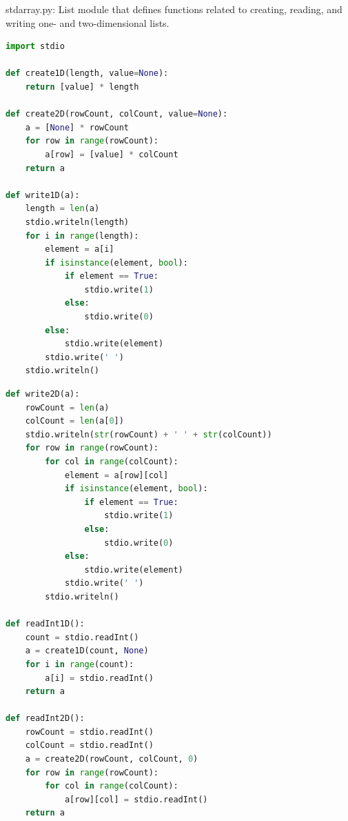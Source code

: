 \documentclass[8pt,a4paper,compress]{beamer}
\begin{document}
\begin{frame}[fragile]
\pause

\begin{framed}
\tiny stdarray.py: List module that defines functions related to creating, reading, and writing one- and two-dimensional lists.
\end{framed}

\begin{lstlisting}[language=Python]
import stdio

def create1D(length, value=None):
    return [value] * length

def create2D(rowCount, colCount, value=None):
    a = [None] * rowCount
    for row in range(rowCount):
        a[row] = [value] * colCount
    return a

def write1D(a):
    length = len(a)
    stdio.writeln(length)
    for i in range(length):
        element = a[i]
        if isinstance(element, bool):
            if element == True:
                stdio.write(1)
            else:
                stdio.write(0) 
        else:
            stdio.write(element)
        stdio.write(' ')
    stdio.writeln()
\end{lstlisting}
\end{frame}

\begin{frame}[fragile]
\pause

\begin{lstlisting}[language=Python]
def write2D(a):
    rowCount = len(a)
    colCount = len(a[0])
    stdio.writeln(str(rowCount) + ' ' + str(colCount))
    for row in range(rowCount):
        for col in range(colCount):
            element = a[row][col]
            if isinstance(element, bool):
                if element == True:
                    stdio.write(1)
                else:
                    stdio.write(0)
            else:
                stdio.write(element)
            stdio.write(' ')
        stdio.writeln()

def readInt1D():
    count = stdio.readInt()
    a = create1D(count, None)
    for i in range(count):
        a[i] = stdio.readInt()
    return a

def readInt2D():
    rowCount = stdio.readInt()
    colCount = stdio.readInt()
    a = create2D(rowCount, colCount, 0)
    for row in range(rowCount):
        for col in range(colCount):
            a[row][col] = stdio.readInt()
    return a
\end{lstlisting}
\end{frame}
\end{document}
